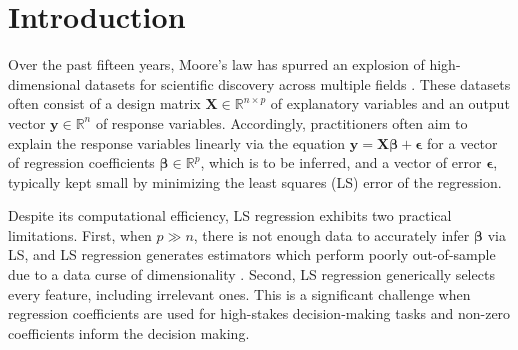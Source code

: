 \documentclass[ijoc,noblindrev]{informs3} %
\begin{document}
%



\maketitle
\vspace{-10mm}

\section{Introduction}\label{sec:intro}
Over the past fifteen years, Moore's law has spurred an %
explosion of high-dimensional datasets for scientific discovery across multiple fields \citep[][]{mcafee2012big}. These datasets often consist of a design matrix $\bm{X} \in \mathbb{R}^{n \times p}$ of explanatory variables and an output vector $\bm{y} \in \mathbb{R}^n$ of response variables. Accordingly, practitioners often aim to explain the response variables linearly via the equation $\bm{y}=\bm{X}\bm{\beta}+\bm{\epsilon}$ for a vector of regression coefficients $\bm{\beta} \in \mathbb{R}^p$, which is to be inferred, and a vector of error $\bm{\epsilon}$, typically kept small by minimizing the least squares (LS) error of the regression. 

Despite its computational efficiency, LS regression exhibits two practical limitations. First, when $p \gg n$, there is not enough data to accurately infer $\bm{\beta}$ via LS, and LS regression generates estimators which perform poorly out-of-sample due to a data curse of dimensionality \citep[][]{buhlmann2011statistics, gamarnik2022sparse}.
Second, LS regression generically selects every feature, including irrelevant ones. This is a significant challenge when regression coefficients are used for high-stakes decision-making tasks and non-zero coefficients inform the decision making.
\end{document}
